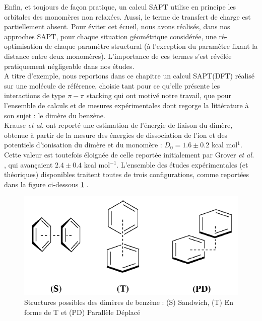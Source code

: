 	
	Enfin, et toujours de façon pratique, un calcul SAPT utilise en principe les orbitales des monomères non relaxées. Aussi, le terme de transfert de charge est partiellement absent. Pour éviter cet écueil, nous avons réalisés, dans nos approches SAPT, pour chaque situation géométrique considérée, une ré-optimisation de chaque paramètre structural (à l'exception du paramètre fixant la distance entre deux monomères). L’importance de ces termes s’est révélée pratiquement négligeable dans nos études.\\
	
	A titre d’exemple, nous reportons dans ce chapitre un calcul SAPT(DFT) réalisé sur une molécule de référence, choisie tant pour ce qu'elle présente les interactions de type $\pi-\pi$ stacking qui ont motivé notre travail, que pour l'ensemble de calculs et de mesures expérimentales dont regorge la littérature à son sujet : le dimère du benzène. \\
	
	Krause \textit{et al.} \cite{krause1991binding} ont reporté une estimation de l’énergie de liaison du dimère, obtenue à partir de la mesure des énergies de dissociation de l'ion et des potentiels d’ionisation du dimère et du monomère : $D_{0}= 1.6 \pm 0.2$ kcal mol$^{1}$. Cette valeur est toutefois éloignée de celle reportée initialement par Grover \textit{et al.} \cite{grover1987dissociation}, qui avançaient $2.4 \pm 0.4$ kcal mol$^{-1}$. 
	L’ensemble des études expérimentales (et théoriques) disponibles traitent toutes de trois configurations, comme reportées dans la figure ci-dessous \ref{figprot} .
	
	\begin{figure}[H]
		\centering
		\includegraphics[scale=0.8]{image/Prot} 
		\caption[Structures du dimère de Benzène]{Structures possibles des dimères de benzène : (S) Sandwich, (T) En forme de T et (PD) Parallèle Déplacé} \label{figprot}
	\end{figure}
	
